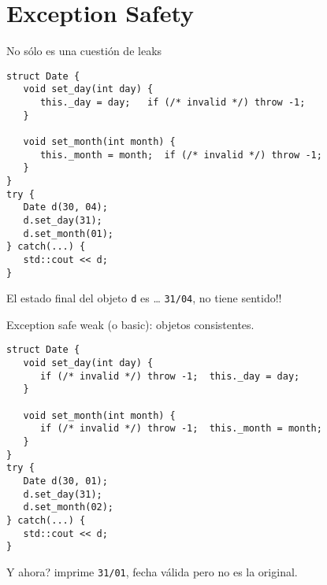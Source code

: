 \section{Exception Safety}
\begin{frame}[fragile]{No s\'olo es una cuesti\'on de leaks}
   \begin{lstlisting}[style=normal]
struct Date {
   void set_day(int day) {
      this._day = day;   if (/* invalid */) throw -1;
   }

   void set_month(int month) {
      this._month = month;  if (/* invalid */) throw -1;
   }
}
try {
   Date d(30, 04);
   d.set_day(31);
   d.set_month(01);
} catch(...) {
   std::cout << d;
}
   \end{lstlisting}
El estado final del objeto \lstinline[style=normal]!d! es \dots
\pause
\lstinline[style=normal]!31/04!, no tiene sentido!!
\end{frame}

\begin{frame}[fragile]{Exception safe weak (o basic): objetos consistentes.}
   \begin{lstlisting}[style=normal]
struct Date {
   void set_day(int day) {
      if (/* invalid */) throw -1;  this._day = day;
   }

   void set_month(int month) {
      if (/* invalid */) throw -1;  this._month = month;
   }
}
try {
   Date d(30, 01);
   d.set_day(31);
   d.set_month(02);
} catch(...) {
   std::cout << d;
}
   \end{lstlisting}
Y ahora?
\pause
imprime \lstinline[style=normal]!31/01!, fecha v\'alida pero no es la original.
\end{frame}

